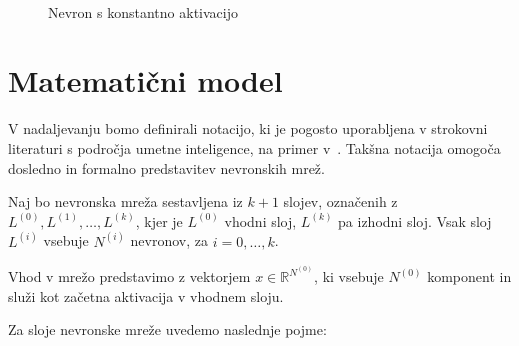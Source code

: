 \begin{figure}[H]
  \centering
  
  \caption{Nevron s konstantno aktivacijo}~\label{fig:nn-bias}
\end{figure}


\section{Matematični model}

V nadaljevanju bomo definirali notacijo, ki je pogosto uporabljena v strokovni literaturi s področja umetne inteligence, na primer v~\cite{Hastie2009}. Takšna notacija omogoča dosledno in formalno predstavitev nevronskih mrež.

Naj bo nevronska mreža sestavljena iz $k+1$ slojev, označenih z $L^{(0)}, L^{(1)}, \dots, L^{(k)}$, kjer je $L^{(0)}$ vhodni sloj, $L^{(k)}$ pa izhodni sloj. Vsak sloj $L^{(i)}$ vsebuje $N^{(i)}$ nevronov, za $i = 0, \dots, k$.

Vhod v mrežo predstavimo z vektorjem $x \in \mathbb{R}^{N^{(0)}}$, ki vsebuje $N^{(0)}$ komponent in služi kot začetna aktivacija v vhodnem sloju.

Za sloje nevronske mreže uvedemo naslednje pojme:


